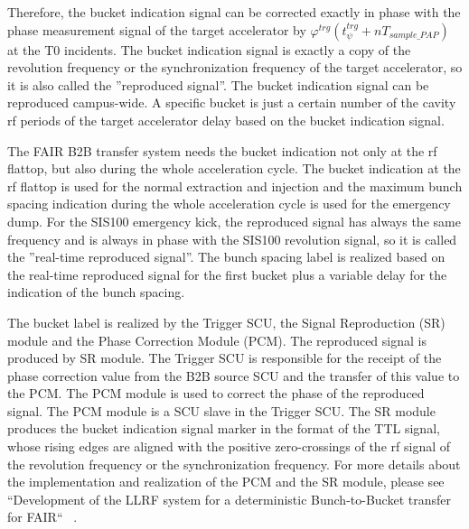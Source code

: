 Therefore, the bucket indication signal can be corrected exactly in phase with the phase measurement signal of the target accelerator by $ \varphi^\mathit{trg}(t_\mathit{\psi}^\mathit{trg}+nT_\mathit{sample\_PAP})$ at the T0 incidents. The bucket indication signal is exactly a copy of the revolution frequency or the synchronization frequency of the target accelerator, so
it is also called the ”reproduced signal”. The bucket indication signal can be reproduced campus-wide. A specific bucket is just a certain number of the cavity rf periods of the target accelerator delay based on the bucket indication signal.






The FAIR B2B transfer system needs the bucket indication not only at the rf flattop, but also during the whole acceleration cycle. The bucket indication at the rf flattop is used for the normal extraction and injection and the maximum bunch spacing indication during the whole acceleration cycle is used for the emergency dump. For the SIS100 emergency kick, the reproduced signal has always the same frequency and is always in phase with the SIS100 revolution signal, so it is called the ''real-time reproduced signal''. The bunch spacing label is realized based on the real-time reproduced signal for the first bucket plus a variable delay for the indication of the bunch spacing.


The bucket label is realized by the Trigger SCU, the Signal Reproduction (SR) module and the Phase Correction Module (PCM). The reproduced signal is produced by SR module. The Trigger SCU is responsible for the receipt of the phase correction value from the B2B source SCU and the transfer of this value to the PCM. The PCM module is used to correct the phase of the reproduced signal. The PCM module is a SCU slave in the Trigger SCU. The SR module produces the bucket indication signal marker in the format of the TTL signal, whose rising edges are aligned with the positive zero-crossings of the rf signal of the revolution frequency or the synchronization frequency. For more details about the implementation and realization of the PCM and the SR module, please see ``Development of the LLRF system for a deterministic Bunch-to-Bucket transfer for FAIR`` ~\cite{ferrand_development_nodate}. 

